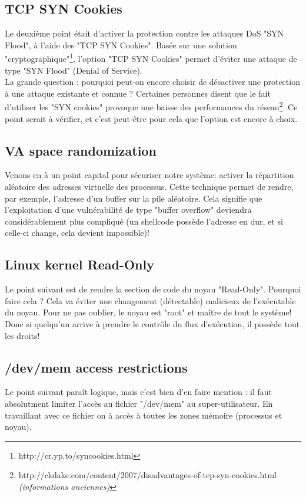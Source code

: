 \subsection{TCP SYN Cookies}
Le deuxième point était d'activer la protection contre les attaques DoS "SYN Flood", à l'aide des "TCP SYN Cookies". 
Basée sur une solution "cryptographique"\footnote{http://cr.yp.to/syncookies.html}, l'option "TCP SYN Cookies" permet d'éviter une attaque de type "SYN Flood" (Denial of Service).\\
La grande question : pourquoi peut-on encore choisir de désactiver une protection à une attaque existante et connue ?
Certaines personnes disent que le fait d'utiliser les "SYN cookies" provoque une baisse des performances du réseau\footnote{http://ckdake.com/content/2007/disadvantages-of-tcp-syn-cookies.html \textit{(informations anciennes)}}. Ce point serait à vérifier, et c'est peut-être pour cela que l'option est encore à choix.\\

\subsection{VA space randomization}
Venons en à un point capital pour sécuriser notre système: activer la répartition aléatoire des adresses virtuelle des processus. 
Cette technique permet de rendre, par exemple, l'adresse d'un buffer sur la pile aléatoire. Cela signifie que l'exploitation d'une vulnérabilité de type "buffer overflow" deviendra considérablement plus compliqué (un shellcode possède l'adresse en dur, et si celle-ci change, cela devient impossible)! \\

\subsection{Linux kernel Read-Only}
Le point suivant est de rendre la section de code du noyau "Read-Only". Pourquoi faire cela ? Cela va éviter une changement (détectable) malicieux de l'exécutable du noyau. Pour ne pas oublier, le noyau est "root" et maître de tout le système! Donc si quelqu'un arrive à prendre le contrôle du flux d'exécution, il possède tout les droits!\\

\subsection{/dev/mem access restrictions}
Le point suivant paraît logique, mais c'est bien d'en faire mention : il faut absolutment limiter l'accès au fichier "/dev/mem" au super-utilisateur. En travaillant avec ce fichier on à accès à toutes les zones mémoire (processus et noyau). \\

